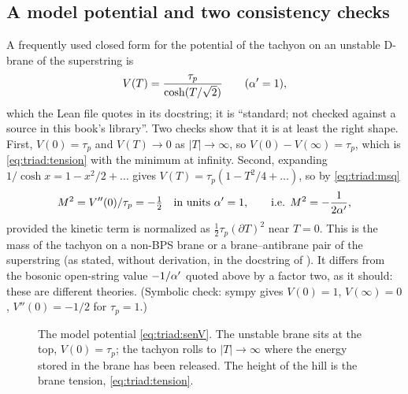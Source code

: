 \subsection{A model potential and two consistency checks}

A frequently used closed form for the potential of the tachyon on an unstable D-brane of the
superstring is
\begin{equation}\label{eq:triad:senV}
V(T)=\frac{\tau_p}{\cosh(T/\sqrt2)}\qquad(\alpha'=1),
\end{equation}
which the Lean file  quotes in its docstring; it is
``standard; not checked against a source in this book's library''. Two checks show that it is at
least the right shape. First, $V(0)=\tau_p$ and $V(T)\to0$ as $|T|\to\infty$, so
$V(0)-V(\infty)=\tau_p$, which is \eqref{eq:triad:tension} with the minimum at infinity.
Second, expanding $1/\cosh x=1-x^2/2+\dots$ gives $V(T)=\tau_p(1-T^2/4+\dots)$, so by
\eqref{eq:triad:msq}
\begin{equation}\label{eq:triad:sencheck}
M^2=V''(0)/\tau_p=-\tfrac12\quad\text{in units }\alpha'=1,\qquad\text{i.e. } M^2=-\frac1{2\alpha'},
\end{equation}
provided the kinetic term is normalized as $\tfrac12\tau_p(\partial T)^2$ near $T=0$. This is
the mass of the tachyon on a non-BPS brane or a brane--antibrane pair of the superstring (as
stated, without derivation, in the docstring of ). It differs
from the bosonic open-string value $-1/\alpha'$ quoted above by a factor two, as it should: these
are different theories. (Symbolic check: sympy gives $V(0)=1$, $V(\infty)=0$, $V''(0)=-1/2$ for
$\tau_p=1$.)

\begin{figure}[ht]
\centering
{}
\caption{The model potential \eqref{eq:triad:senV}. The unstable brane sits at the top,
$V(0)=\tau_p$; the tachyon rolls to $|T|\to\infty$ where the energy stored in the brane has
been released. The height of the hill is the brane tension, \eqref{eq:triad:tension}.}
\label{fig:triad:senV}
\end{figure}

